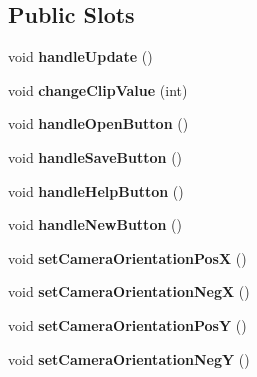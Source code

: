 \subsection*{Public Slots}
\begin{DoxyCompactItemize}
\item 
void {\bfseries handle\+Update} ()\hypertarget{class_main_window_a5c6cea005b60afcc4e0555e40e280e1d}{}\label{class_main_window_a5c6cea005b60afcc4e0555e40e280e1d}

\item 
void {\bfseries change\+Clip\+Value} (int)\hypertarget{class_main_window_a49b774e1f63554608bcc44d90eba8ce2}{}\label{class_main_window_a49b774e1f63554608bcc44d90eba8ce2}

\item 
void {\bfseries handle\+Open\+Button} ()\hypertarget{class_main_window_a16434089bdb53bc4c867c558c0a7fbb4}{}\label{class_main_window_a16434089bdb53bc4c867c558c0a7fbb4}

\item 
void {\bfseries handle\+Save\+Button} ()\hypertarget{class_main_window_ac52b63ed01bbdd8fd4425be619927c8a}{}\label{class_main_window_ac52b63ed01bbdd8fd4425be619927c8a}

\item 
void {\bfseries handle\+Help\+Button} ()\hypertarget{class_main_window_a919e75cfef556ae0b5611d6655734d1a}{}\label{class_main_window_a919e75cfef556ae0b5611d6655734d1a}

\item 
void {\bfseries handle\+New\+Button} ()\hypertarget{class_main_window_ab015df9a44e44eed7dfb685bd2c38295}{}\label{class_main_window_ab015df9a44e44eed7dfb685bd2c38295}

\item 
void {\bfseries set\+Camera\+Orientation\+PosX} ()\hypertarget{class_main_window_a1983dc5e6d5ccdf46e9f7d1a88835d3d}{}\label{class_main_window_a1983dc5e6d5ccdf46e9f7d1a88835d3d}

\item 
void {\bfseries set\+Camera\+Orientation\+NegX} ()\hypertarget{class_main_window_a4d572113ca36123c0c7dc765b289b413}{}\label{class_main_window_a4d572113ca36123c0c7dc765b289b413}

\item 
void {\bfseries set\+Camera\+Orientation\+PosY} ()\hypertarget{class_main_window_a4980ce0a94fd49b25bf3d005bfaf4756}{}\label{class_main_window_a4980ce0a94fd49b25bf3d005bfaf4756}

\item 
void {\bfseries set\+Camera\+Orientation\+NegY} ()\hypertarget{class_main_window_a50b850ca17eb434ff702ea5e87b3cbfe}{}\label{class_main_window_a50b850ca17eb434ff702ea5e87b3cbfe}


\end{DoxyCompactItemize}
